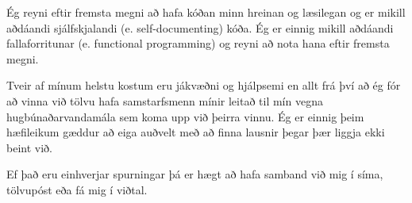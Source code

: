 \documentclass[11pt,a4paper,sans]{moderncv}
\begin{document}
{    Ég reyni eftir fremsta megni að hafa kóðan minn hreinan og læsilegan og er mikill aðdáandi sjálfskjalandi (e. self-documenting) kóða. Ég er einnig mikill aðdáandi fallaforritunar (e. functional programming) og reyni að nota hana eftir fremsta megni.

    Tveir af mínum helstu kostum eru jákvæðni og hjálpsemi en allt frá því að ég fór að vinna við tölvu hafa samstarfsmenn mínir leitað til mín vegna hugbúnaðarvandamála sem koma upp við þeirra vinnu. Ég er einnig þeim hæfileikum gæddur að eiga auðvelt með að finna lausnir þegar þær liggja ekki beint við.
    
    Ef það eru einhverjar spurningar þá er hægt að hafa samband við mig í síma, tölvupóst eða fá mig í viðtal.
    
    \makeletterclosing
}
\end{document}
